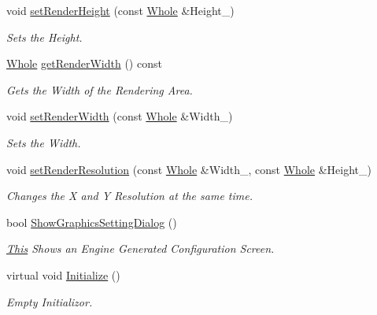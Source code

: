 \begin{DoxyCompactItemize}
void \hyperlink{classphys_1_1GraphicsManager_a8d59e9a8aa2ae7f520d388a4c70f0623}{setRenderHeight} (const \hyperlink{namespacephys_a460f6bc24c8dd347b05e0366ae34f34a}{Whole} \&Height\_\-)
\begin{DoxyCompactList}\small\item\em Sets the Height. \item\end{DoxyCompactList}\item 
\hyperlink{namespacephys_a460f6bc24c8dd347b05e0366ae34f34a}{Whole} \hyperlink{classphys_1_1GraphicsManager_a9e1ce1f9f8bcff7712fd5beaf7cf2337}{getRenderWidth} () const 
\begin{DoxyCompactList}\small\item\em Gets the Width of the Rendering Area. \item\end{DoxyCompactList}\item 
void \hyperlink{classphys_1_1GraphicsManager_aea5fb5808a23fa29c8522c396ac0d6b5}{setRenderWidth} (const \hyperlink{namespacephys_a460f6bc24c8dd347b05e0366ae34f34a}{Whole} \&Width\_\-)
\begin{DoxyCompactList}\small\item\em Sets the Width. \item\end{DoxyCompactList}\item 
void \hyperlink{classphys_1_1GraphicsManager_ac6feb044d9ab394f3e65d51026a899a6}{setRenderResolution} (const \hyperlink{namespacephys_a460f6bc24c8dd347b05e0366ae34f34a}{Whole} \&Width\_\-, const \hyperlink{namespacephys_a460f6bc24c8dd347b05e0366ae34f34a}{Whole} \&Height\_\-)
\begin{DoxyCompactList}\small\item\em Changes the X and Y Resolution at the same time. \item\end{DoxyCompactList}\item 
bool \hyperlink{classphys_1_1GraphicsManager_adcded385b6442aa5da6097f1edd5471a}{ShowGraphicsSettingDialog} ()
\begin{DoxyCompactList}\small\item\em \hyperlink{structThis}{This} Shows an Engine Generated Configuration Screen. \item\end{DoxyCompactList}\item 
virtual void \hyperlink{classphys_1_1GraphicsManager_a554572de5d1cdce37aa1760d6e6e039c}{Initialize} ()
\begin{DoxyCompactList}\small\item\em Empty Initializor. \item\end{DoxyCompactList}\item 

\end{DoxyCompactItemize}
